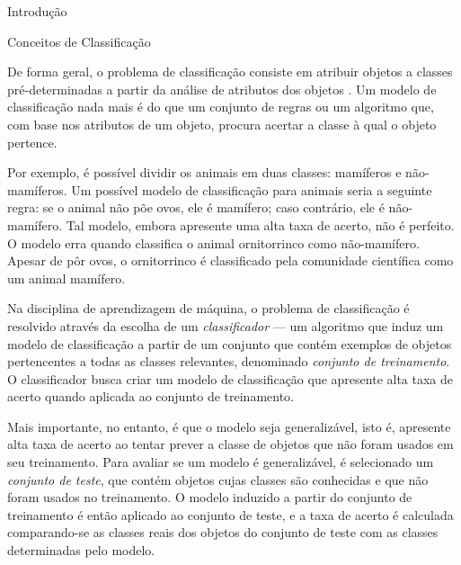 \begin{section}{Introdução}
\end{section}

\begin{section}{Conceitos de Classificação} \label{cap:clas1}
	
	De forma geral, o problema de classificação consiste em atribuir objetos a classes pré-determinadas a partir da análise de atributos dos objetos \cite{Tan2005}. Um modelo de classificação nada mais é do que um conjunto de regras ou um algoritmo que, com base nos atributos de um objeto, procura acertar a classe à qual o objeto pertence. 

	Por exemplo, é possível dividir os animais em duas classes: mamíferos e não-mamíferos. Um possível modelo de classificação para animais seria a seguinte regra: se o animal não põe ovos, ele é mamífero; caso contrário, ele é não-mamífero. Tal modelo, embora apresente uma alta taxa de acerto, não é perfeito. O modelo erra quando classifica o animal ornitorrinco como não-mamífero. Apesar de pôr ovos, o ornitorrinco é classificado pela comunidade científica como um animal mamífero.
	
	
	
	Na disciplina de aprendizagem de máquina, o problema de classificação é resolvido através da escolha de um \emph{classificador} --- um algoritmo que induz um modelo de classificação a partir de um conjunto que contém exemplos de objetos pertencentes a todas as classes relevantes, denominado \emph{conjunto de treinamento}. O classificador busca criar um modelo de classificação que apresente alta taxa de acerto quando aplicada ao conjunto de treinamento. 
	
	Mais importante, no entanto, é que o modelo seja generalizável, isto é, apresente alta taxa de acerto ao tentar prever a classe de objetos que não foram usados em seu treinamento. Para avaliar se um modelo é generalizável, é selecionado um \emph{conjunto de teste}, que contém objetos cujas classes são conhecidas e que não foram usados no treinamento. O modelo induzido a partir do conjunto de treinamento é então aplicado ao conjunto de teste, e a taxa de acerto é calculada comparando-se as classes reais dos objetos do conjunto de teste com as classes determinadas pelo modelo.
	
	
\end{section}	
	
